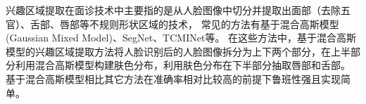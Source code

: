 





兴趣区域提取在面诊技术中主要指的是从人脸图像中切分并提取出面部（去除五官）、舌部、唇部等不规则形状区域的技术，
常见的方法有基于混合高斯模型(Gaussian Mixed Model)\cite{Hu2016Robust}、SegNet\cite{Badrinarayanan2017SegNet}、TCMINet\cite{li2020tcminet}等。
在这些方法中，基于混合高斯模型的兴趣区域提取方法将人脸识别后的人脸图像拆分为上下两个部分，在上半部分利用混合高斯模型构建肤色分布，利用肤色分布在下半部分抽取唇部和舌部。
基于混合高斯模型相比其它方法在准确率相对比较高的前提下鲁班性强且实现简单。


